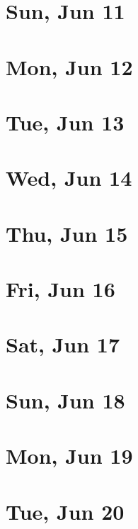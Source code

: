 	\section{Sun, Jun 11}
		
	\section{Mon, Jun 12}
		
	\section{Tue, Jun 13}
		
	\section{Wed, Jun 14}
		
	\section{Thu, Jun 15}
		
	\section{Fri, Jun 16}
		
	\section{Sat, Jun 17}
		
	\section{Sun, Jun 18}
		
	\section{Mon, Jun 19}
		
	\section{Tue, Jun 20}
		
